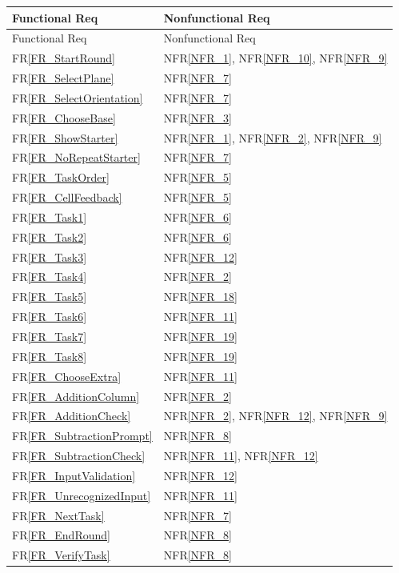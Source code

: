 \documentclass[12pt]{article}
\newcommand{\rref}[1]{FR\ref{#1}}
\newcommand{\nfrref}[1]{NFR\ref{#1}}
\begin{document}
\begin{longtable}{p{} p{}}
\toprule
Functional Req & Nonfunctional Req \\
\midrule
\endfirsthead

\toprule
Functional Req & Nonfunctional Req \\
\midrule
\endhead

\endlastfoot

\rref{FR_StartRound} & \nfrref{NFR_1}, \nfrref{NFR_10}, \nfrref{NFR_9} \\
\rref{FR_SelectPlane} & \nfrref{NFR_7} \\
\rref{FR_SelectOrientation} & \nfrref{NFR_7} \\
\rref{FR_ChooseBase} & \nfrref{NFR_3} \\
\rref{FR_ShowStarter} & \nfrref{NFR_1}, \nfrref{NFR_2}, \nfrref{NFR_9} \\
\rref{FR_NoRepeatStarter} & \nfrref{NFR_7} \\
\rref{FR_TaskOrder} & \nfrref{NFR_5} \\
\rref{FR_CellFeedback} & \nfrref{NFR_5} \\
\rref{FR_Task1} & \nfrref{NFR_6} \\
\rref{FR_Task2} & \nfrref{NFR_6} \\
\rref{FR_Task3} & \nfrref{NFR_12} \\
\rref{FR_Task4} & \nfrref{NFR_2} \\
\rref{FR_Task5} & \nfrref{NFR_18} \\
\rref{FR_Task6} & \nfrref{NFR_11} \\
\rref{FR_Task7} & \nfrref{NFR_19} \\
\rref{FR_Task8} & \nfrref{NFR_19} \\
\rref{FR_ChooseExtra} & \nfrref{NFR_11} \\
\rref{FR_AdditionColumn} & \nfrref{NFR_2} \\
\rref{FR_AdditionCheck} & \nfrref{NFR_2}, \nfrref{NFR_12}, \nfrref{NFR_9} \\
\rref{FR_SubtractionPrompt} & \nfrref{NFR_8} \\
\rref{FR_SubtractionCheck} & \nfrref{NFR_11}, \nfrref{NFR_12} \\
\rref{FR_InputValidation} & \nfrref{NFR_12} \\
\rref{FR_UnrecognizedInput} & \nfrref{NFR_11} \\
\rref{FR_NextTask} & \nfrref{NFR_7} \\
\rref{FR_EndRound} & \nfrref{NFR_8} \\
\rref{FR_VerifyTask} & \nfrref{NFR_8} \\

\end{longtable}
\end{document}
